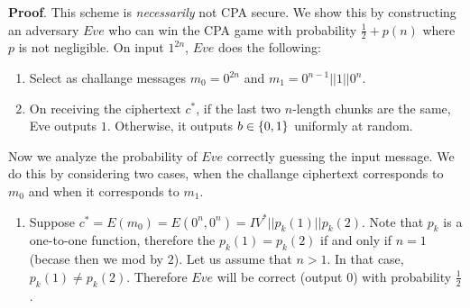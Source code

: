 \documentclass{article}
\begin{document}
\begin{enumerate}
\begin{enumerate}[,label=\alph*.]
\begin{mdbmarginx}{1ex}{0pt}{1ex}{0pt}%
\noindent{}\textbf{Proof}.  This scheme is \emph{necessarily} not CPA secure. We show this by constructing an adversary $Eve$ who can
win the CPA game with probability $\frac{1}{2} + p(n)$ where $p$ is not negligible. On input $1^{2n}$, 
$Eve$ does the following:%

\begin{enumerate}[noitemsep,topsep=\mdcompacttopsep]%

\item{}Select as challange messages $m_0 = 0^{2n}$ and $m_1 = 0^{n-1}||1||0^n$.%

\item{}On receiving the ciphertext $c^*$, if the last two $n$-length chunks are the same, Eve outputs $1$.
Otherwise, it outputs $b \in \{0,1\}$ uniformly at random.%
\end{enumerate}%

\noindent{}Now we analyze the probability of $Eve$ correctly guessing the input message. We do this by considering
two cases, when the challange ciphertext corresponds to $m_0$ and when it corresponds to $m_1$.%

\begin{enumerate}[noitemsep,topsep=\mdcompacttopsep]%

\item{}Suppose $c^* = E(m_0) = E(0^n, 0^n) = IV^* || p_k(1) || p_k(2)$. Note that $p_k$ is a one-to-one 
function, therefore the $p_k(1) = p_k(2)$ if and only if $n = 1$ (becase then we mod by $2$). Let us
assume that $n > 1$. In that case, $p_k(1) \neq p_k(2)$. Therefore $Eve$ will be correct (output $0$)
with probability $\frac{1}{2}$.%


\end{enumerate}
\end{mdbmarginx}
\end{enumerate}
\end{enumerate}
\end{document}
